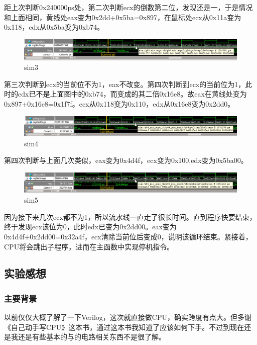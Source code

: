 距上次判断0x240000ps处，第二次判断ecx的倒数第二位，发现还是一，于是情况和上面相同，黄线处eax变为0x2dd+0x5ba=0x897，在鼠标处ecx从0x11a变为0x118，edx从0x5ba变为0xb74。

\begin{figure}[htbp]
\centering
\includegraphics{img/sim3.png}
\caption{sim3}
\end{figure}

第三次判断到ecx的当前位不为1，eax不改变。第四次判断到ecx的当前位为1，此时的edx已不是上面图中的0xb74，而变成的其二倍0x16e8。故eax在黄线处变为0x897+0x16e8=0x1f7f。ecx从0x118变为0x110，edx从0x16e8变为0x2dd0。

\begin{figure}[htbp]
\centering
\includegraphics{img/sim4.png}
\caption{sim4}
\end{figure}

第四次判断与上面几次类似，eax变为0x4d4f，ecx变为0x100,edx变为0x5ba00。

\begin{figure}[htbp]
\centering
\includegraphics{img/sim5.png}
\caption{sim5}
\end{figure}

因为接下来几次ecx都不为1，所以流水线一直走了很长时间。直到程序快要结束，终于发现ecx该位为0，此时edx已变为0x2dd00。eax变为0x4d4f+0x2dd00=0x32a4f，ecx清除当前位后变成0，说明该循环结束。紧接着，CPU将会跳出子程序，进而在主函数中实现停机指令。

\subsection{实验感想}\label{ux5b9eux9a8cux611fux60f3}

\subsubsection{主要背景}\label{ux4e3bux8981ux80ccux666f}

以前仅仅大概了解了一下Verilog，这次就直接做CPU，确实跨度有点大。但多谢《自己动手写CPU》这本书，通过这本书我知道了应该如何下手。不过到现在还是我还是有些基本的与的电路相关东西不是很了解。

